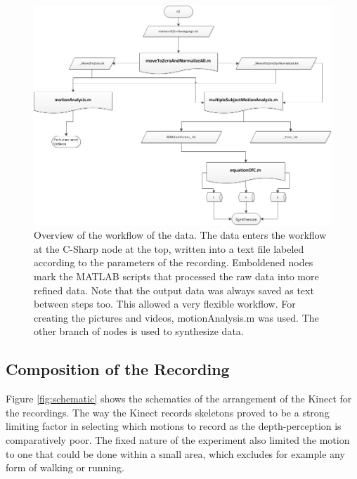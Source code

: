 \documentclass[a4paper]{article}
\begin{document}
\begin{figure}
	\centering
	\includegraphics[width=16cm]{matlabaufbau.png}
	\caption{Overview of the workflow of the data. The data enters the workflow at the C-Sharp node at the top, written into a text file labeled according to the parameters of the recording. Emboldened nodes mark the MATLAB scripts that processed the raw data into more refined data. Note that the output data was always saved as text between steps too. This allowed a very flexible workflow. For creating the pictures and videos, motionAnalysis.m was used. The other branch of nodes is used to synthesize data.}
	\label{fig:workflow}
\end{figure}

\subsection{Composition of the Recording}

Figure \ref{fig:schematic} shows the schematics of the arrangement of the Kinect for the recordings.
The way the Kinect records skeletons proved to be a strong limiting factor in selecting which motions to record as the depth-perception is comparatively poor.
The fixed nature of the experiment also limited the motion to one that could be done within a small area, which excludes for example any form of walking or running.
\end{document}
